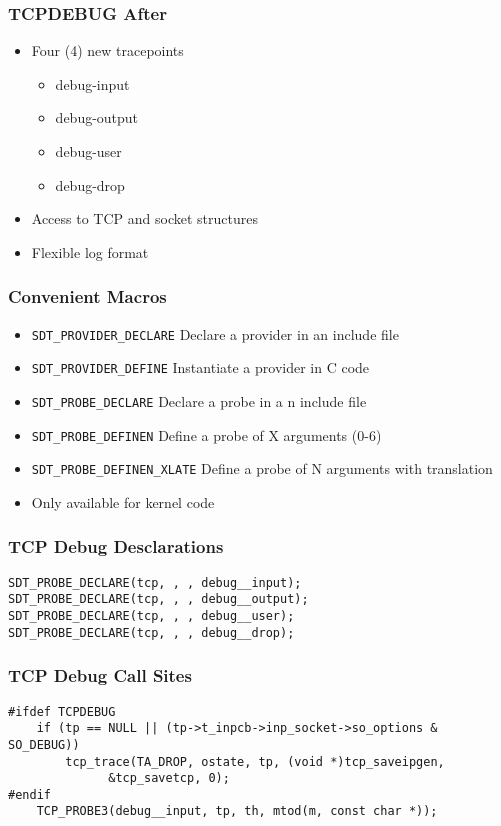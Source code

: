 \documentclass[pdftex]{beamer}
\begin{document}
\begin{frame}
  \frametitle{TCPDEBUG After}
  \begin{itemize}
  \item Four (4) new tracepoints
    \begin{itemize}
    \item debug-input
    \item debug-output
    \item debug-user
    \item debug-drop
    \end{itemize}
  \item Access to TCP and socket structures
  \item Flexible log format
  \end{itemize}
\end{frame}

\begin{frame}[fragile]
  \frametitle{Convenient Macros}
  \begin{itemize}
  \item \verb|SDT_PROVIDER_DECLARE| Declare a provider in an include file
  \item \verb|SDT_PROVIDER_DEFINE| Instantiate a provider in C code
  \item \verb|SDT_PROBE_DECLARE| Declare a probe in a n include file
  \item \verb|SDT_PROBE_DEFINEN| Define a probe of X arguments (0-6)
  \item \verb|SDT_PROBE_DEFINEN_XLATE| Define a probe of N arguments with translation
  \item Only available for kernel code
  \end{itemize}
\end{frame}

\begin{frame}[fragile]
  \frametitle{TCP Debug Desclarations}
\begin{lstlisting}
SDT_PROBE_DECLARE(tcp, , , debug__input);
SDT_PROBE_DECLARE(tcp, , , debug__output);
SDT_PROBE_DECLARE(tcp, , , debug__user);
SDT_PROBE_DECLARE(tcp, , , debug__drop);
\end{lstlisting}
\end{frame}

\begin{frame}[fragile]
  \frametitle{TCP Debug Call Sites}
\begin{lstlisting}
#ifdef TCPDEBUG
	if (tp == NULL || (tp->t_inpcb->inp_socket->so_options & SO_DEBUG))
		tcp_trace(TA_DROP, ostate, tp, (void *)tcp_saveipgen,
			  &tcp_savetcp, 0);
#endif
	TCP_PROBE3(debug__input, tp, th, mtod(m, const char *));
\end{lstlisting}
\end{frame}
\end{document}
